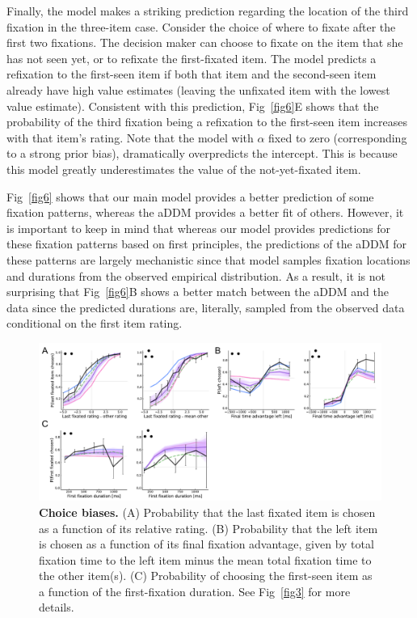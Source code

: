 Finally, the model makes a striking prediction regarding the location of the third fixation in the three-item case. Consider the choice of where to fixate after the first two fixations. The decision maker can choose to fixate on the item that she has not seen yet, or to refixate the first-fixated item. The model predicts a refixation to the first-seen item if both that item and the second-seen item already have high value estimates (leaving the unfixated item with the lowest value estimate). Consistent with this prediction, Fig~\ref{fig6}E shows that the probability of the third fixation being a refixation to the first-seen item increases with that item's rating. Note that the model with $\alpha$ fixed to zero (corresponding to a strong prior bias), dramatically overpredicts the intercept. This is because this model greatly underestimates the value of the not-yet-fixated item.

Fig~\ref{fig6} shows that our main model provides a better prediction of some fixation patterns, whereas the aDDM provides a better fit of others. However, it is important to keep in mind that whereas our model provides predictions for these fixation patterns based on first principles, the predictions of the aDDM for these patterns are largely mechanistic since that model samples fixation locations and durations from the observed empirical distribution. As a result, it is not surprising that Fig~\ref{fig6}B shows a better match between the aDDM and the data since the predicted durations are, literally, sampled from the observed data conditional on the first item rating.


\begin{figure}[t!]
  \centering
  \includegraphics[width=\textwidth]{figs/attention/Fig7.pdf}
  \caption{\textbf{Choice biases.}
  (A) Probability that the last fixated item is chosen as a function of its relative rating.
  (B) Probability that the left item is chosen as a function of its final fixation advantage, given by total fixation time to the left item minus the mean total fixation time to the other item(s).
  (C) Probability of choosing the first-seen item as a function of the first-fixation duration.
  See Fig~\ref{fig3} for more details.
  }
  \label{fig7}
\end{figure}


